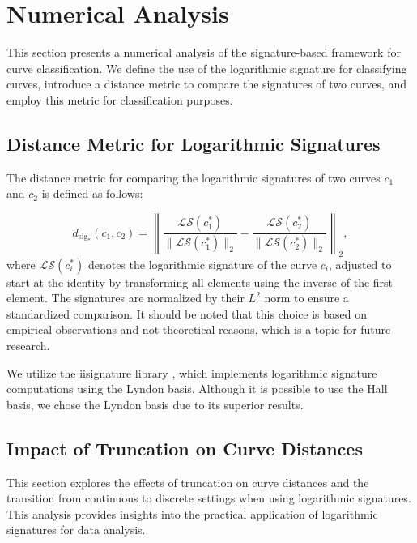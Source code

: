 \section{Numerical Analysis}
\label{sec:signature-numerical}

This section presents a numerical analysis of the signature-based framework for curve classification. We define the use of the logarithmic signature for classifying curves, introduce a distance metric to compare the signatures of two curves, and employ this metric for classification purposes.

\subsection{Distance Metric for Logarithmic Signatures}
\label{subsec:distance-metric-signature}

The distance metric for comparing the logarithmic signatures of two curves \(c_1\) and \(c_2\) is defined as follows:

\begin{equation}
    d_{\text{sig}_*}(c_1, c_2) = \left\| \frac{\mathcal{LS}(c_1^*)}{\|\mathcal{LS}(c_1^*)\|_2} - \frac{\mathcal{LS}(c_2^*)}{\|\mathcal{LS}(c_2^*)\|_2} \right\|_2,
    \label{eq:signature-distance-metric}
\end{equation}
where \(\mathcal{LS}(c_i^*)\) denotes the logarithmic signature of the curve \(c_i\), adjusted to start at the identity by transforming all elements using the inverse of the first element. The signatures are normalized by their \(L^2\) norm to ensure a standardized comparison. It should be noted that this choice is based on empirical observations and not theoretical reasons, which is a topic for future research.

We utilize the iisignature library \cite{reizensteinIisignatureLibraryEfficient2018}, which implements logarithmic signature computations using the Lyndon basis. Although it is possible to use the Hall basis, we chose the Lyndon basis due to its superior results.

\subsection{Impact of Truncation on Curve Distances}
\label{subsec:truncation-curve-distances-signature}

This section explores the effects of truncation on curve distances and the transition from continuous to discrete settings when using logarithmic signatures. This analysis provides insights into the practical application of logarithmic signatures for data analysis.

